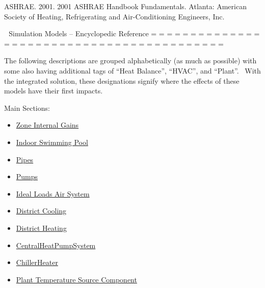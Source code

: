 ASHRAE. 2001. 2001 ASHRAE Handbook Fundamentals. Atlanta: American Society of Heating, Refrigerating and Air-Conditioning Engineers, Inc.

﻿ ﻿ Simulation Models -- Encyclopedic Reference = = = = = = = = = = = = = = = = = = = = = = = = = = = = = = = = = = = = = = = = = =

The following descriptions are grouped alphabetically (as much as possible) with some also having additional tags of ``Heat Balance'', ``HVAC'', and ``Plant''.~ With the integrated solution, these designations signify where the effects of these models have their first impacts.

Main Sections:

\begin{itemize}
\tightlist
\item
  \protect\hyperlink{ZoneGains}{Zone Internal Gains}
\item
  \protect\hyperlink{IndoorSwimmingPool}{Indoor Swimming Pool}
\item
  \protect\hyperlink{Pipes}{Pipes}
\item
  \protect\hyperlink{Pumps}{Pumps}
\item
  \protect\hyperlink{IdealLoads}{Ideal Loads Air System}
\item
  \protect\hyperlink{DistrictCooling}{District Cooling}
\item
  \protect\hyperlink{DistrictHeating}{District Heating}
\item
  \protect\hyperlink{CentralHeatPumpSystem}{CentralHeatPumpSystem}
\item
  \protect\hyperlink{ChillerHeater}{ChillerHeater}
\item
  \protect\hyperlink{PlantComponents}{Plant Temperature Source Component} 
\end{itemize}
